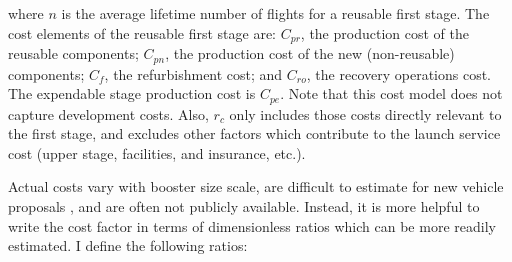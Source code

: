 \documentclass[conf]{new-aiaa}
\begin{document}
where $n$ is the average lifetime number of flights for a reusable first stage. The cost elements of the reusable first stage are: $C_{pr}$, the production cost of the reusable components; $C_{pn}$, the production cost of the new (non-reusable) components; $C_f$, the refurbishment cost; and $C_{ro}$, the recovery operations cost. The expendable stage production cost is $C_{pe}$. Note that this cost model does not capture development costs. Also, $r_c$ only includes those costs directly relevant to the first stage, and excludes other factors which contribute to the launch service cost (upper stage, facilities, and insurance, etc.).

Actual costs vary with booster size scale, are difficult to estimate for new vehicle proposals \cite{Sforza2015}, and are often not publicly available. Instead, it is more helpful to write the cost factor in terms of dimensionless ratios which can be more readily estimated. I define the following ratios:
\end{document}
